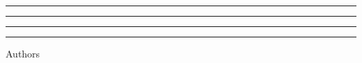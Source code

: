 \begin{titlepage}
    \selectfont %
    \centering\scshape %
	\vspace*{\baselineskip} %

    {\LARGE\textcolor{redreport}{\univname}\par}

    \vspace{2\baselineskip}

    \rule{\textwidth}{1.6pt}\vspace*{-\baselineskip}\vspace*{2pt} 
	\rule{\textwidth}{0.4pt}
	
	\vspace{0.75\baselineskip}

	{\Large\MakeUppercase{\thetitle}\par}
	
	\vspace{0.75\baselineskip}
	
	\rule{\textwidth}{0.4pt}\vspace*{-\baselineskip}\vspace{3.2pt}
	\rule{\textwidth}{1.6pt}

    \vspace{2\baselineskip}

    {\large{\subname}}

    \vspace*{3\baselineskip}

    Authors
	
	\vspace{0.5\baselineskip}
	
	{\scshape\Large 
        \textcolor{redreport}{\firstauthorname} \\ 

        \ifdefined\secondauthorname
            \textcolor{redreport}{\secondauthorname} \\
        \fi

        \ifdefined\thirdauthorname
            \textcolor{redreport}{\thirdauthorname} \\
        \fi
    }
	
	\vspace{0.8\baselineskip}
	
	\textit{\schoolname}

    \vspace{0.2\baselineskip}
	
	\textit{\degname}

    \vspace{0.2\baselineskip}
	
	\textit{\coursename}
	
	\vfill

    {\thedate}
\end{titlepage}